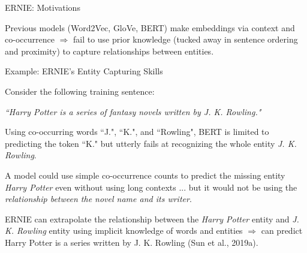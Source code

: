 \begin{frame}{ERNIE: Motivations}

    \vspace{10pt}
    
    \begin{itemizeSpaced}{2pt}
        \pinkbox Previous models (Word2Vec, GloVe, BERT) make embeddings via context and co-occurrence $\Rightarrow$ fail to use prior knowledge (tucked away in sentence ordering and proximity) to capture relationships between entities. 
    \end{itemizeSpaced}

    
    \vspace{-5pt}
    \begin{exampleBlock}{Example: ERNIE's Entity Capturing Skills}
        
        Consider the following training sentence: \newline 
        
        {\footnotesize \textit{``Harry Potter is a series of fantasy novels written by J. K. Rowling."}}\newline 
        
        Using co-occurring words ``J.", ``K.", and ``Rowling", BERT is limited to predicting the token ``K." but utterly fails at recognizing the whole entity \emph{J. K. Rowling}. \newline 
        
        A model could use simple co-occurrence counts to predict the missing entity \emph{Harry Potter} even without using long contexts ... but it would not be using the \emph{\alert{relationship between the novel name and its writer}}. 
    \end{exampleBlock}


    \vspace{-5pt}
    \begin{itemizeSpaced}{2pt} 
        
         ERNIE can extrapolate the relationship between the \emph{Harry Potter} entity and \emph{J. K. Rowling} entity using implicit knowledge of words and entities $\Rightarrow$ can predict Harry Potter is a series written by J. K. Rowling (Sun et al., 2019a). 
    
    \end{itemizeSpaced}
    
\end{frame}


